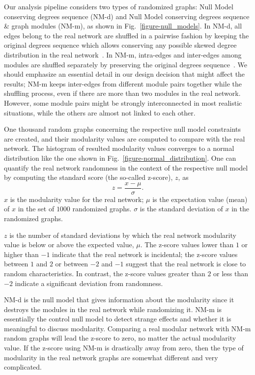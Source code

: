 Our analysis pipeline considers two types of randomized graphs: Null Model conserving degrees sequence (NM-d) and Null Model conserving degrees sequence \& graph modules (NM-m), as shown in Fig.~\ref{figure-null_models}. In NM-d, all edges belong to the real network are shuffled in a pairwise fashion by keeping the original degrees sequence which allows conserving any possible skewed degree distribution in the real network~\cite{FORTUNATO201075, Fretter2012}. In NM-m, intra-edges and inter-edges among modules are shuffled separately by preserving the original degrees sequence~\cite{Fretter2012}. We should emphasize an essential detail in our design decision that might affect the results; NM-m keeps inter-edges from different module pairs together while the shuffling process, even if there are more than two modules in the real network. However, some module pairs might be strongly interconnected in most realistic situations, while the others are almost not linked to each other.


One thousand random graphs concerning the respective null model constraints are created, and their modularity values are computed to compare with the real network. The histogram of resulted modularity values converges to a normal distribution like the one shown in Fig.~\ref{figure-normal_distribution}. One can quantify the real network randomness in the context of the respective null model by computing the standard score (the so-called z-score), $z$, as
\begin{equation} %
	z = \frac{x-\mu}{\sigma}.
	\label{zscore}
\end{equation} 
$x$ is the modularity value for the real network; $\mu$ is the expectation value (mean) of $x$ in the set of $1000$ randomized graphs. $\sigma$ is the standard deviation of $x$ in the randomized graphs. 

$z$ is the number of standard deviations by which the real network modularity value is below or above the expected value, $\mu$. The z-score values lower than $1$ or higher than $-1$ indicate that the real network is incidental; the z-score values between $1$ and $2$ or between $-2$ and $-1$ suggest that the real network is close to random characteristics. In contrast, the z-score values greater than $2$ or less than $-2$ indicate a significant deviation from randomness.

NM-d is the null model that gives information about the modularity since it destroys the modules in the real network while randomizing it. NM-m is essentially the control null model to detect strange effects and whether it is meaningful to discuss modularity. Comparing a real modular network with NM-m random graphs will lead the z-score to zero, no matter the actual modularity value. If the z-score using NM-m is drastically away from zero, then the type of modularity in the real network graphs are somewhat different and very complicated. 

